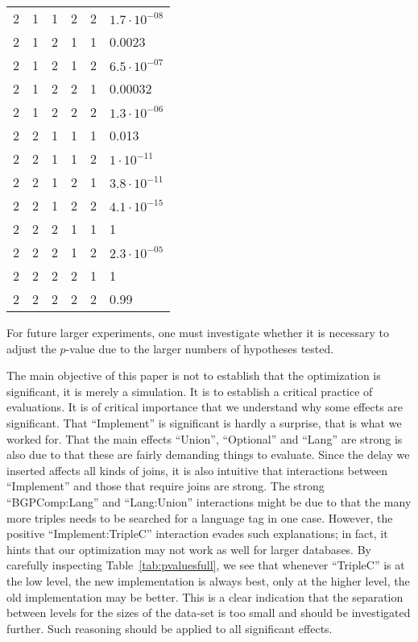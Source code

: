 \documentclass{llncs}
\begin{document}
\begin{table}[ht!]
\begin{center}
\begin{tabular}{cccccl}
  2 & 1 & 1 & 2 & 2 & $1.7 \cdot 10^{-08}$ \\ 
  2 & 1 & 2 & 1 & 1 & 0.0023 \\ 
  2 & 1 & 2 & 1 & 2 & $6.5 \cdot 10^{-07}$ \\ 
  2 & 1 & 2 & 2 & 1 & 0.00032 \\ 
  2 & 1 & 2 & 2 & 2 & $1.3 \cdot 10^{-06}$ \\ 
  2 & 2 & 1 & 1 & 1 & 0.013 \\ 
  2 & 2 & 1 & 1 & 2 & $1 \cdot 10^{-11}$ \\ 
  2 & 2 & 1 & 2 & 1 & $3.8 \cdot 10^{-11}$ \\ 
  2 & 2 & 1 & 2 & 2 & $4.1 \cdot 10^{-15}$ \\ 
  2 & 2 & 2 & 1 & 1 &   1 \\ 
  2 & 2 & 2 & 1 & 2 & $2.3 \cdot 10^{-05}$ \\ 
  2 & 2 & 2 & 2 & 1 &   1 \\ 
  2 & 2 & 2 & 2 & 2 & 0.99 \\ 
   \hline
\end{tabular}
\end{center}
\end{table}


For future larger experiments, one must investigate whether it is
necessary to adjust the $p$-value due to the larger numbers of
hypotheses tested.

The main objective of this paper is not to establish that the
optimization is significant, it is merely a simulation. It is to
establish a critical practice of evaluations. It is of critical
importance that we understand why some effects are significant. That
``Implement'' is significant is hardly a surprise, that is what we
worked for. That the main effects ``Union'', ``Optional'' and ``Lang''
are strong is also due to that these are fairly demanding things to
evaluate. Since the delay we inserted affects all kinds of joins, it
is also intuitive that interactions between ``Implement'' and those
that require joins are strong. The strong ``BGPComp:Lang'' and
``Lang:Union'' interactions might be due to that the many more triples
needs to be searched for a language tag in one case. However, the
positive ``Implement:TripleC'' interaction evades such explanations;
in fact, it hints that our optimization may not work as well for
larger databases. By carefully inspecting Table~\ref{tab:pvaluesfull},
we see that whenever ``TripleC'' is at the low level, the
new implementation is always best, only at the higher level, the old
implementation may be better. This is a clear indication that the
separation between levels for the sizes of the data-set is too small
and should be investigated further. Such reasoning should be applied
to all significant effects.
\end{document}
